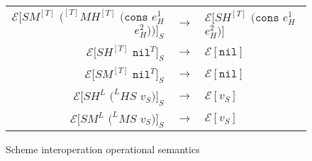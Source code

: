 \begin{figure}[p]
\begin{tabular}{rcl}
$\mathscr{E}[SM^{[T]}$ $(^{[T]}MH^{[T]}$ $(\mathtt{cons}$ $e_{H}^{1}$ $e_{H}^{2}))]_{S}$ & $\rightarrow$ & $\mathscr{E}[SH^{[T]}$ $(\mathtt{cons}$ $e_{H}^{1}$ $e_{H}^{2})]$ \\
$\mathscr{E}[SH^{[T]}$ $\mathtt{nil}^{T}]_{S}$ & $\rightarrow$ & $\mathscr{E}[\mathtt{nil}]$ \\
$\mathscr{E}[SM^{[T]}$ $\mathtt{nil}^{T}]_{S}$ & $\rightarrow$ & $\mathscr{E}[\mathtt{nil}]$ \\
$\mathscr{E}[SH^{L}$ $(^{L}HS$ $v_{S})]_{S}$ & $\rightarrow$ & $\mathscr{E}[v_{S}]$ \\
$\mathscr{E}[SM^{L}$ $(^{L}MS$ $v_{S})]_{S}$ & $\rightarrow$ & $\mathscr{E}[v_{S}]$
\end{tabular}
\caption{Scheme interoperation operational semantics}
\label{sios}
\end{figure}